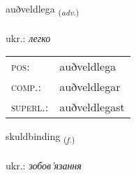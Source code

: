 \documentclass[frontgrid, backgrid]{flacards}\usepackage[]{graphicx}\usepackage[]{xcolor}
\begin{document}
\renewcommand{\flhead}{\vskip5pt \fboxsep=0pt {\small\bfseries\footnotesize Atviksorð | прислівник}}
\renewcommand{\fcfoot}{\vskip5pt \fboxsep=0pt \hspace{2pt}{\small\bfseries\footnotesize 3K}}

\renewcommand{\blhead}{\vskip5pt {\small\bfseries\footnotesize Atviksorð | прислівник }}
\renewcommand{\bcfoot}{\vskip5pt \hspace{2pt}{\small\bfseries\footnotesize 3K}}


{auðveldlega \small{\textsubscript{(\textit{adv.})}} \\[1ex] %
\textphonetic{[œiðvɛltlɛɣa]} \\
ukr.: \emph{легко} \\  [2ex]
\renewcommand*{\arraystretch}{0.8}
\begin{tabular}{ll}
\textsc{pos}: & auðveldlega \\ 
\textsc{comp.}: & auðveldlegar \\ 
\textsc{superl.}: & auðveldlegast \\
\end{tabular}
}

\renewcommand{\flhead}{\vskip5pt \fboxsep=0pt {\small\bfseries\footnotesize Nafnorð | іменник}}
\renewcommand{\fcfoot}{\vskip5pt \fboxsep=0pt \hspace{2pt}{\small\bfseries\footnotesize 3K}}

\renewcommand{\blhead}{\vskip5pt {\small\bfseries\footnotesize Nafnorð | іменник }}
\renewcommand{\bcfoot}{\vskip5pt \hspace{2pt}{\small\bfseries\footnotesize 3K}}


{skuldbinding \small{\textsubscript{(\textit{f.})}} \\[1ex] %
\textphonetic{[skʏltpɪntiŋk]} \\
ukr.: \emph{зобов'язання} \\  [2ex]
\renewcommand*{\arraystretch}{0.8}
}
\end{document}
